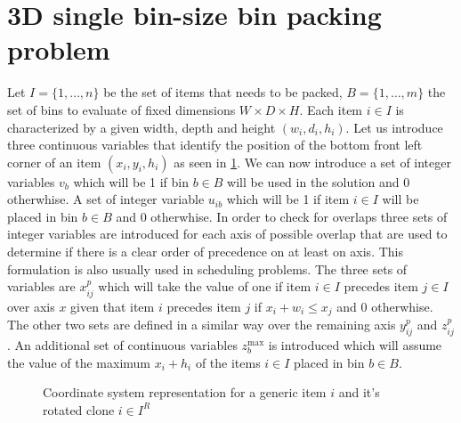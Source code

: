 \section{3D single bin-size bin packing problem}
\label{sec:milp}%
Let $I = \{1,\dots, n \}$ be the set of items that needs to be packed, $B = \{1,\dots, m \}$ the set of bins to evaluate of fixed dimensions $W \times D \times H$.
Each item $i \in I$ is characterized by a given width, depth  and height $(w_i, d_i, h_i)$. 
Let us introduce three continuous variables that identify the position of the bottom front left corner of an item $(x_i, y_i, h_i)$ as seen in \cref{fig:coordinate_system}.
We can now introduce a set of integer variables $v_{b}$ which will be 1 if bin $b \in B$ will be used in the solution and 0 otherwhise. A set of integer variable $u_{ib}$ which will be 1 if item $i \in I$ will be placed in bin $b \in B$ and 0 otherwhise.
In order to check for overlaps three sets of integer variables are introduced for each axis of possible overlap that are used to determine if there is a clear order of precedence on at least on axis. This formulation is also usually used in scheduling problems.
The three sets of variables are $x^p_{ij}$ which will take the value of one if item $i \in I$ precedes item $j \in I$ over axis $x$ given that item $i$ precedes item $j$ if $x_i + w_i \le x_j$ and 0 otherwhise. 
The other two sets are defined in a similar way over the remaining axis $y^p_{ij}$ and $z^p_{ij}$. An additional set of continuous variables $z_b^\text{max}$ is introduced which will assume the value of the maximum $x_i + h_i$ of the items $i \in I$ placed in bin $b \in B$.

\begin{figure}
    \scalebox{0.62}{%
    
    }
    \caption{Coordinate system representation for a generic item $i$ and it's rotated clone $i \in I^R$}
    \label{fig:coordinate_system}
\end{figure}

